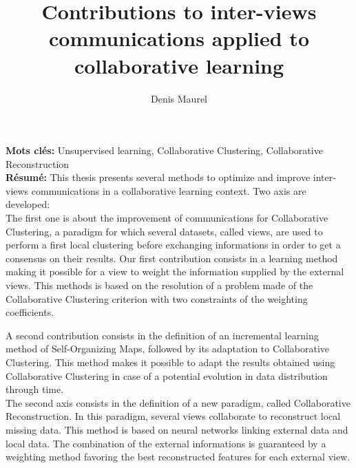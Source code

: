 \documentclass[a4paper]{article}
\begin{document}
\title{Contributions to inter-views communications applied to collaborative learning}
\author{Denis Maurel}
\maketitle

\textbf{Mots clés:} \quad Unsupervised learning, Collaborative Clustering, Collaborative Reconstruction\\


\textbf{Résumé:} \quad This thesis presents several methods to optimize and improve inter-views communications in a collaborative learning context. Two axis are developed:\\

The first one is about the improvement of communications for Collaborative Clustering, a paradigm for which several datasets, called views, are used to perform a first local clustering before exchanging informations in order to get a consensus on their results. Our first contribution consists in a learning method making it possible for a view to weight the information supplied by the external views. This methods is based on the resolution of a problem made of the Collaborative Clustering criterion with two constraints of the weighting coefficients.

A second contribution consists in the definition of an incremental learning method of Self-Organizing Maps, followed by its adaptation to Collaborative Clustering. This method makes it possible to adapt the results obtained using Collaborative Clustering in case of a potential evolution in data distribution through time.\\

The second axis consists in the definition of a new paradigm, called Collaborative Reconstruction. In this paradigm, several views collaborate to reconstruct local missing data. This method is based on neural networks linking external data and local data. The combination of the external informations is guaranteed by a weighting method favoring the best reconstructed features for each external view.
\end{document}
